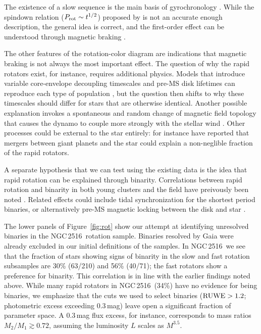 \documentclass[12pt,twocolumn,tighten]{aastex63}
\newcommand{\cn}{NGC\,2516} %
\begin{document}
The existence of a slow sequence is the main basis of gyrochronology
\citep[{\it e.g.},][]{barnes_rotational_2003}.  While the 
spindown relation ($P_{\rm rot}\sim t^{1/2}$) proposed by
\citet{skumanich_time_1972} is not an accurate enough description, the
general idea is correct, and the first-order effect can be understood
through magnetic braking \citep{weber_angular_1967}.

The other features of the rotation-color diagram are indications that
magnetic braking is not always the most important effect.  The
question of why the rapid rotators exist, for instance, requires
additional physics.  Models that introduce variable
core-envelope decoupling timescales and pre-MS disk lifetimes can
reproduce each type of population
\citep{Irwin_NGC2516_2007,gallet_improved_2013,gallet_improved_2015},
but the question then shifts to why these timescales should
differ for stars that are otherwise identical.  Another possible
explanation invokes a spontaneous and random change of magnetic field
topology that causes the dynamo to couple more strongly with the
stellar wind \citep{brown_metastable_2014}.  Other processes could be
external to the star entirely: \citet{qureshi_signature_2018} for
instance have reported that mergers between giant planets and the star
could explain a non-neglible fraction of the rapid rotators.

A separate hypothesis that we can test using the existing data is the
idea that rapid rotation can be explained through binarity.  
Correlations between rapid rotation and binarity in both young
clusters and the field have preivously been noted
\citep{meibom_effect_2007,stauffer_rotation_2016,simonian_rapid_2019,gillen_ngts_2020}.
Related effects could include tidal synchronization for the shortest
period binaries, or alternatively pre-MS magnetic locking between the
disk and star \citep[{\it
e.g.},][]{koenigl_disk_1991,long_locking_2005}.

The lower panels of Figure~\ref{fig:rot} show our attempt at
identifying unresolved binaries in the \cn\ rotation sample.  Binaries
resolved by Gaia were already excluded in our initial definitions of
the samples.  In \cn\, we see that the fraction of stars showing signs
of binarity in the slow and fast rotation subsamples are 30\% (63/210)
and 56\% (40/71); the fast rotators show a preference for binarity.
This correlation is in line with the earlier findings noted above.
While many rapid rotators in \cn\ (34\%) have no evidence for being
binaries, we emphasize that the cuts we used to select binaries (${\rm
RUWE}>1.2$; photometric excess exceeding 0.3\,mag) leave open a
significant fraction of parameter space.  A 0.3\,mag flux excess, for
instance, corresponds to mass ratios $M_2/M_1 \gtrsim 0.72$, assuming
the luminosity $L$ scales as $M^{3.5}$. 
\end{document}

